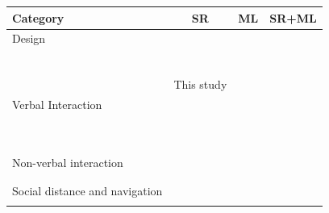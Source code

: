 \begin{table}[t]
\label{ch1:tab:related}
\centering
\footnotesize
\setlength{\tabcolsep}{0.1cm}
\begin{tabular}{l|c|c|c}
\toprule
\textbf{Category} & \textbf{SR} & \textbf{ML} & \textbf{SR+ML} \\
\midrule
Design & \makecell{\citep{akinade2023culturally, Dingjun2010}\\
\citep{ornelas2023redefining, Lee2016}\\
\citep{Papadopoulos_CARESSES, battistuzzi2021socially}\\
\citep{papadopoulos2020caresses, Shibata2009}\\
\citep{zantou2023culturally, 8673086}\\
\citep{vernon2024african, papadopoulos2022transcultural}\\
\citep{recchiuto2019designing}} 
& \makecell{\citep{miehle2021multimodal, khan2021one}\\
\citep{dmytryk2022mining, karpouzis2024plato}} 
& This study \\
\hline
Verbal Interaction & \makecell{\citep{Andrist2015, chugh2024aisles}\\
\citep{Bruno2018, nias2020culturebot}\\
\citep{bruno2016fuzzy, Rau2009}\\
\citep{obremski2022impact, CloudCultureDialogue}\\
\citep{recchiuto2020feasibility}} 
& \makecell{\citep{blanchard2024cultural}\\
\citep{bhatia2023gd}\\
\citep{almaliki2016persuasive, dlHumorRecognition}\\
\citep{albuquerque2024hype, Wu2012TheAO}\\
\citep{cirucci2024culturally, kuo2024identification}\\
\citep{dwivedi2024navigating}} 
& \citep{spitale2024appropriateness} \\
\hline
Non-verbal interaction & \makecell{\citep{Rehm2018, GreetingSelection}\\
\citep{pena2019eeva}} 
&  & \makecell{\citep{Gestures}\\
\citep{ren2025exploring}} \\
\hline
Social distance and navigation & \makecell{\citep{Eresha2013, Joosse2014}\\
\citep{Trovato2015, truong2016towards}} 
&  & \citep{patompak2017learning} \\

\end{tabular}
\end{table}
